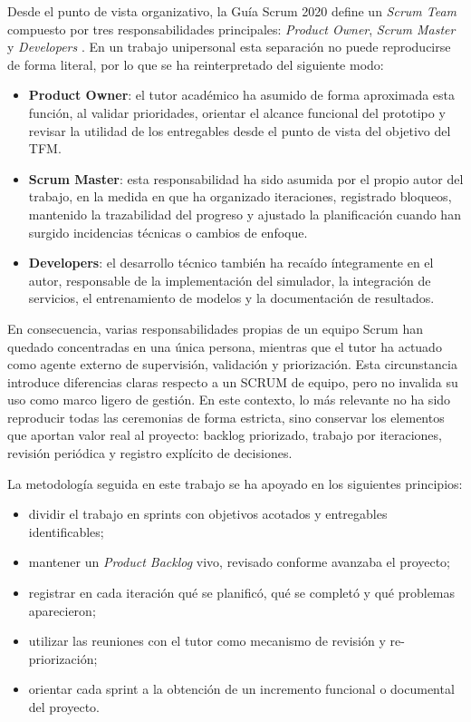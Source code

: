 \newpage
Desde el punto de vista organizativo, la Guía Scrum 2020 define un \textit{Scrum Team} compuesto por tres responsabilidades principales: \textit{Product Owner}, \textit{Scrum Master} y \textit{Developers} \cite{ScrumGuide2020}. En un trabajo unipersonal esta separación no puede reproducirse de forma literal, por lo que se ha reinterpretado del siguiente modo:
\begin{itemize}
  \item \textbf{Product Owner}: el tutor académico ha asumido de forma aproximada esta función, al validar prioridades, orientar el alcance funcional del prototipo y revisar la utilidad de los entregables desde el punto de vista del objetivo del TFM.
  \item \textbf{Scrum Master}: esta responsabilidad ha sido asumida por el propio autor del trabajo, en la medida en que ha organizado iteraciones, registrado bloqueos, mantenido la trazabilidad del progreso y ajustado la planificación cuando han surgido incidencias técnicas o cambios de enfoque.
  \item \textbf{Developers}: el desarrollo técnico también ha recaído íntegramente en el autor, responsable de la implementación del simulador, la integración de servicios, el entrenamiento de modelos y la documentación de resultados.
\end{itemize}

En consecuencia, varias responsabilidades propias de un equipo Scrum han quedado concentradas en una única persona, mientras que el tutor ha actuado como agente externo de supervisión, validación y priorización. Esta circunstancia introduce diferencias claras respecto a un SCRUM de equipo, pero no invalida su uso como marco ligero de gestión. En este contexto, lo más relevante no ha sido reproducir todas las ceremonias de forma estricta, sino conservar los elementos que aportan valor real al proyecto: backlog priorizado, trabajo por iteraciones, revisión periódica y registro explícito de decisiones.\newline

La metodología seguida en este trabajo se ha apoyado en los siguientes principios:
\begin{itemize}
  \item dividir el trabajo en sprints con objetivos acotados y entregables identificables;
  \item mantener un \textit{Product Backlog} vivo, revisado conforme avanzaba el proyecto;
  \item registrar en cada iteración qué se planificó, qué se completó y qué problemas aparecieron;
  \item utilizar las reuniones con el tutor como mecanismo de revisión y re-priorización;
  \item orientar cada sprint a la obtención de un incremento funcional o documental del proyecto.
\end{itemize}

